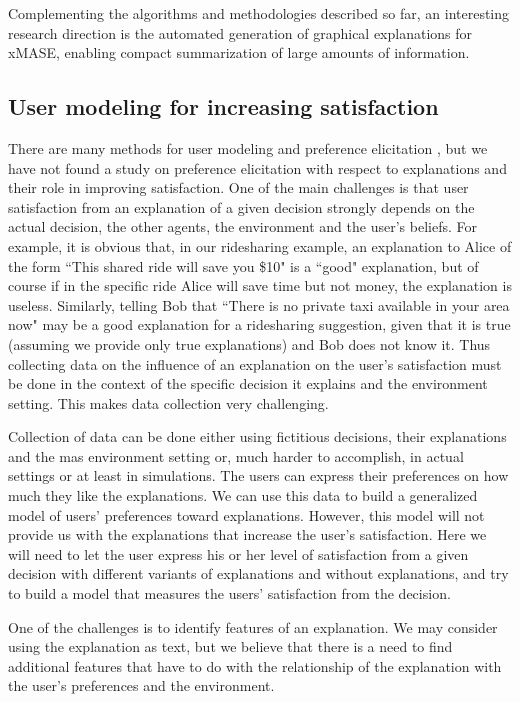 \documentclass[letterpaper]{article} %
\begin{document}
Complementing  the algorithms and methodologies described so far, an interesting research direction is the automated generation of graphical explanations for xMASE, enabling compact summarization of large amounts of information. 
\subsection{User modeling for increasing satisfaction}
There are many methods for user modeling and preference elicitation \cite{rosenfeld2018predicting,anselmi2018comparison}, but we have not found a study on preference elicitation with respect to explanations and their role in improving satisfaction. One of the main challenges is that user  satisfaction from an explanation of a given decision strongly depends on the actual decision, the other agents, the environment and the user's beliefs. For example, it is obvious that, in our ridesharing example, an explanation to Alice of the form ``This shared ride will save you \$10" is a ``good" explanation, but of course if in the specific ride Alice will save time but not money, the explanation is useless. Similarly, telling Bob that ``There is no private taxi available in your area now" may be a good explanation for a ridesharing suggestion, given that it is true (assuming we provide only true explanations) and Bob does not know it. Thus collecting data on the influence of an explanation on the user's satisfaction must be done in the context of the specific decision it explains and the environment setting. This makes data collection very challenging.

Collection of data can be done either using fictitious decisions, their explanations and the \ac{mas} environment setting or, much harder to accomplish, in actual settings or at least in simulations. 
The users can express their preferences on how much they like the explanations. We can use this data to build a generalized model of users' preferences toward explanations. However, this model will not provide us with the explanations that increase the user's satisfaction. Here we will need to let the user express his or her level of  satisfaction from a given decision with different variants of explanations and without explanations, and try to build a model that measures the users' satisfaction from the decision.

One of the challenges is to identify features of an explanation. We may consider using the explanation as text, but we believe that there is a need to find additional features that have to do with the relationship of the explanation with the user's preferences and the environment. 
\end{document}
